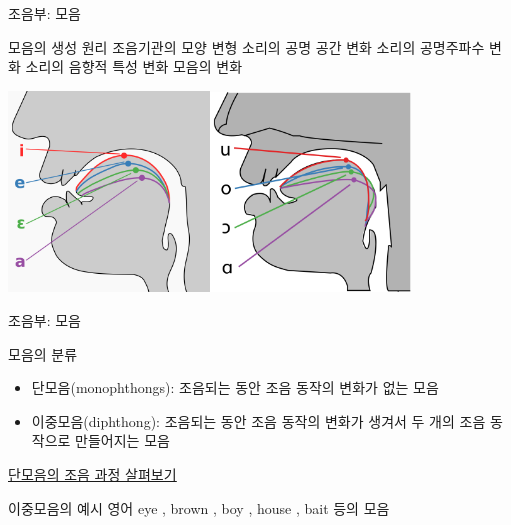 \documentclass[11pt, aspectratio=169]{beamer}
\newcommand{\textds}[1]{{\ipafont #1}}
\begin{document}
\begin{frame}[t]{조음부: 모음}
    \begin{block}{모음의 생성 원리}
        조음기관의 모양 변형 \rightarrow 소리의 공명 공간 변화 \rightarrow 소리의 공명주파수 변화 \rightarrow 소리의 음향적 특성 변화 \rightarrow 모음의 변화
    \end{block}
    \centering
    \includegraphics[width=0.4\textwidth]{img/Cardinal_vowel_tongue_position-front.svg.png}\includegraphics[width=0.4\textwidth]{img/Cardinal_vowel_tongue_position-back.svg.png}
\end{frame}

\begin{frame}[t]{조음부: 모음}
    \begin{block}{모음의 분류}
        \begin{itemize}
            \item 단모음(monophthongs): 조음되는 동안 조음 동작의 변화가 없는 모음
            \item 이중모음(diphthong): 조음되는 동안 조음 동작의 변화가 생겨서 두 개의 조음 동작으로 만들어지는 모음
        \end{itemize}
    \end{block}    
     \href{https://seeingspeech.ac.uk}{\underline{단모음의 조음 과정 살펴보기}}

    \begin{block}{이중모음의 예시}
        영어 eye \textds{[aɪ]}, brown \textds{[aʊ]}, boy \textds{[ɔɪ]}, house \textds{[oʊ]}, bait \textds{[eɪ]} 등의 모음
    \end{block}

\end{frame}
\end{document}
